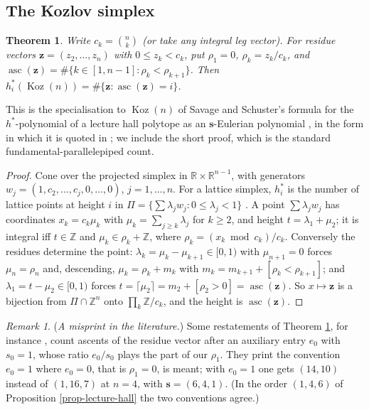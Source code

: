 \documentclass[11pt, a4paper, abstract=yes]{scrartcl}
\theoremstyle{definition}
\theoremstyle{remark}
\newtheorem{remark}[definition]{Remark}
\theoremstyle{plain}
\newtheorem{theorem}[definition]{Theorem}
\newcommand{\vek}[1]{\boldsymbol{#1}}
\theoremstyle{remark}
\theoremstyle{plain}
\newcommand{\Koz}{\operatorname{Koz}}
\newcommand{\asc}{\operatorname{asc}}
\newcommand{\leannone}{\tikz[baseline=-0.6ex]\draw[leannone,line width=0.6pt] (0,0) circle (0.55ex);}
\newcommand{\leanmark}[1]{\leavevmode{\reversemarginpar\marginnote{\raggedleft#1}}}
\begin{document}
\subsection{The Kozlov simplex}
\label{sec:org0ae091c}

\begin{theorem}
\leanmark{\leannone}Write \(c_k=\binom nk\) (or take any integral leg vector). For residue vectors \(\vek z=(z_2,\dots,z_n)\) with
\(0\le z_k<c_k\), put \(\rho_1=0\), \(\rho_k=z_k/c_k\), and
\(\asc(\vek z)=\#\lbrace k\in[1,n-1]:\rho_k<\rho_{k+1}\rbrace\). Then
\(h^*_i(\Koz(n))=\#\lbrace\vek z:\asc(\vek z)=i\rbrace\).
\label{thm-hstar}
\end{theorem}

This is the specialisation to \(\Koz(n)\) of Savage and Schuster's formula for the \(h^*\)-polynomial
of a lecture hall polytope as an \(\vek s\)-Eulerian polynomial \autocite{SavageSchuster2012}, in the
form in which it is quoted in \autocite{SavageVisontai2015,HibiOlsenTsuchiya2018}; we include the
short proof, which is the standard fundamental-parallelepiped count.

\begin{proof}
Cone over the projected simplex in \(\mathbb R\times\mathbb R^{n-1}\), with generators
\(w_j=(1,c_2,\dots,c_j,0,\dots,0)\), \(j=1,\dots,n\). For a lattice simplex, \(h^*_i\) is the number
of lattice points at height \(i\) in \(\Pi=\lbrace\sum\lambda_jw_j:0\le\lambda_j<1\rbrace\)
\autocite[Chapter 3]{BeckRobins2015}. A point \(\sum\lambda_jw_j\) has coordinates \(x_k=c_k\mu_k\) with
\(\mu_k=\sum_{j\ge k}\lambda_j\) for \(k\ge2\), and height \(t=\lambda_1+\mu_2\); it is integral iff
\(t\in\mathbb Z\) and \(\mu_k\in\rho_k+\mathbb Z\), where \(\rho_k=(x_k\bmod c_k)/c_k\). Conversely the
residues determine the point: \(\lambda_k=\mu_k-\mu_{k+1}\in[0,1)\) with \(\mu_{n+1}=0\) forces
\(\mu_n=\rho_n\) and, descending, \(\mu_k=\rho_k+m_k\) with
\(m_k=m_{k+1}+[\rho_k<\rho_{k+1}]\); and \(\lambda_1=t-\mu_2\in[0,1)\) forces
\(t=\lceil\mu_2\rceil=m_2+[\rho_2>0]=\asc(\vek z)\). So \(x\mapsto\vek z\) is a bijection from
\(\Pi\cap\mathbb Z^n\) onto \(\prod_k\mathbb Z/c_k\), and the height is \(\asc(\vek z)\).
\end{proof}

\begin{remark}
(\emph{A misprint in the literature.}) Some restatements of Theorem \ref{thm-hstar}, for instance
\autocite[Lemma 1.1]{HibiOlsenTsuchiya2018}, count ascents of the residue vector after an auxiliary
entry \(e_0\) with \(s_0=1\), whose ratio \(e_0/s_0\) plays the part of our \(\rho_1\). They print the
convention \(e_0=1\) where \(e_0=0\), that is \(\rho_1=0\), is meant; with \(e_0=1\) one gets
\((14,10)\) instead of \((1,16,7)\) at \(n=4\), with \(\vek s=(6,4,1)\). (In the order \((1,4,6)\) of
Proposition \ref{prop-lecture-hall} the two conventions agree.)
\label{rem-hstar-misprint}
\end{remark}
\end{document}
